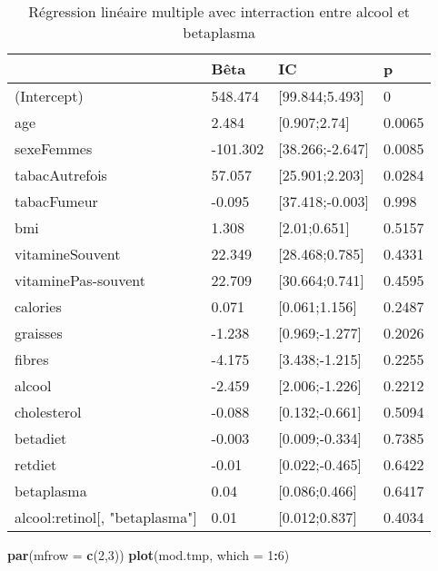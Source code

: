 \documentclass[]{article}
\newenvironment{Shaded}{\begin{snugshade}}{\end{snugshade}}
\newcommand{\KeywordTok}[1]{\textcolor[rgb]{0.13,0.29,0.53}{\textbf{#1}}}
\newcommand{\DataTypeTok}[1]{\textcolor[rgb]{0.13,0.29,0.53}{#1}}
\newcommand{\DecValTok}[1]{\textcolor[rgb]{0.00,0.00,0.81}{#1}}
\newcommand{\OperatorTok}[1]{\textcolor[rgb]{0.81,0.36,0.00}{\textbf{#1}}}
\newcommand{\NormalTok}[1]{#1}
\begin{document}
\begin{table}

\caption{\label{tab:unnamed-chunk-77}Régression linéaire multiple avec interraction entre alcool et betaplasma}
\centering
\begin{tabular}[t]{l|l|l|l}
\hline
  & Bêta & IC & p\\
\hline
\rowcolor[HTML]{BBD2E1}  (Intercept) & 548.474 & [99.844;5.493] & 0\\
\hline
age & 2.484 & [0.907;2.74] & 0.0065\\
\hline
\rowcolor[HTML]{BBD2E1}  sexeFemmes & -101.302 & [38.266;-2.647] & 0.0085\\
\hline
tabacAutrefois & 57.057 & [25.901;2.203] & 0.0284\\
\hline
\rowcolor[HTML]{BBD2E1}  tabacFumeur & -0.095 & [37.418;-0.003] & 0.998\\
\hline
bmi & 1.308 & [2.01;0.651] & 0.5157\\
\hline
\rowcolor[HTML]{BBD2E1}  vitamineSouvent & 22.349 & [28.468;0.785] & 0.4331\\
\hline
vitaminePas-souvent & 22.709 & [30.664;0.741] & 0.4595\\
\hline
\rowcolor[HTML]{BBD2E1}  calories & 0.071 & [0.061;1.156] & 0.2487\\
\hline
graisses & -1.238 & [0.969;-1.277] & 0.2026\\
\hline
\rowcolor[HTML]{BBD2E1}  fibres & -4.175 & [3.438;-1.215] & 0.2255\\
\hline
alcool & -2.459 & [2.006;-1.226] & 0.2212\\
\hline
\rowcolor[HTML]{BBD2E1}  cholesterol & -0.088 & [0.132;-0.661] & 0.5094\\
\hline
betadiet & -0.003 & [0.009;-0.334] & 0.7385\\
\hline
\rowcolor[HTML]{BBD2E1}  retdiet & -0.01 & [0.022;-0.465] & 0.6422\\
\hline
betaplasma & 0.04 & [0.086;0.466] & 0.6417\\
\hline
\rowcolor[HTML]{BBD2E1}  alcool:retinol[, "betaplasma"] & 0.01 & [0.012;0.837] & 0.4034\\
\hline
\end{tabular}
\end{table}

\begin{Shaded}
\begin{Highlighting}[]
\KeywordTok{par}\NormalTok{(}\DataTypeTok{mfrow =} \KeywordTok{c}\NormalTok{(}\DecValTok{2}\NormalTok{,}\DecValTok{3}\NormalTok{))}
\KeywordTok{plot}\NormalTok{(mod.tmp, }\DataTypeTok{which =} \DecValTok{1}\OperatorTok{:}\DecValTok{6}\NormalTok{)}
\end{Highlighting}
\end{Shaded}
\end{document}
